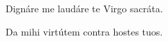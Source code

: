 \vv Dignáre me laudáre te Virgo sacráta. \tpalleluia

\rr Da mihi virtútem contra hostes tuos. \tpalleluia